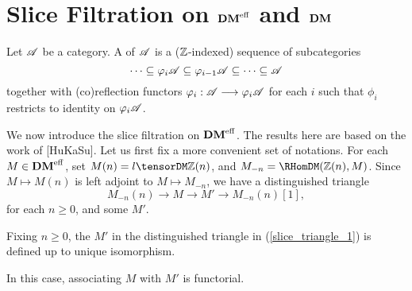 \newpage
\section{Slice Filtration on $\mathbf{DM}^{\mathrm{eff}}$ and $\mathbf{DM}$}\label{sect_slice_filt_dm}

\begin{defn}\label{def_cat_filtration}
Let $\mathscr{A}$ be a category. A  of $\mathscr{A}$ 
is a ($\mathbb{Z}$-indexed) sequence of subcategories
\[
\cdots \subseteq \varphi_i\mathscr{A} \subseteq \varphi_{i - 1}\mathscr{A} \subseteq \cdots 
   \subseteq \mathscr{A}
\]
together with (co)reflection functors $\varphi_i: \mathscr{A} \longrightarrow 
\varphi_i\mathscr{A}$ for each $i$ such that $\phi_i$ restricts to 
identity on $\varphi_i\mathscr{A}$.
\end{defn}

We now introduce the slice filtration on $\mathbf{DM}^{\mathrm{eff}}$. The results here
are based on the work of [HuKaSu]. Let us first fix a more 
convenient set of notations. For each $M \in \mathbf{DM}^{\mathrm{eff}}$, set $M(n) = 
l \tensorDM \Z(n)$, and $M_{-n} = \RHomDM(\Z(n), M)$. Since $M \mapsto
M(n)$ is left adjoint to $M \mapsto M_{-n}$, we have a 
distinguished triangle 
\begin{equation}\label{slice_triangle_1}
M_{-n}(n) \to M \to M' \to M_{-n}(n)[1],
\end{equation}
for each $n \geq 0$, and some $M'$. 

\begin{prop}
Fixing $n \geq 0$, the $M'$ in the distinguished triangle in
(\ref{slice_triangle_1}) is defined up to unique isomorphism.

In this case, associating $M$ with $M'$ is functorial.
\end{prop}


